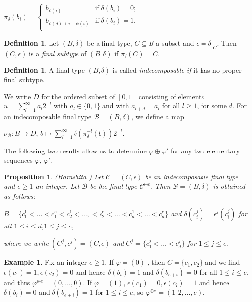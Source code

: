 \documentclass[11pt,table]{amsart}
\numberwithin{equation}{section}
\newtheorem{prop}[thm]{Proposition}
\theoremstyle{definition}
\newtheorem{defn}[thm]{Definition}
\newtheorem{eg}[thm]{Example}
\theoremstyle{remark}
\theoremstyle{remark}
\begin{document}
\begin{center}
    $\pi_{\delta} \left( b_{i} \right)  = \left\{
	\begin{array}{ll}
		 b_{\psi(i)}   & \mbox{if } \delta(b_{i}) = 0; \\
		b_{\psi(d) + i - \psi(i)} & \mbox{if } \delta(b_{i}) =1.  \\
	\end{array}
\right.$
\end{center}
\begin{defn}
   Let $(B, \delta)$ be a final type, $C \subseteq B$ a subset and $ \epsilon = \delta \vert _{C}$. Then $(C, \epsilon)$ is a \textit{final subtype} of $(B, \delta)$ if $ \pi_{\delta}(C) = C$. 
\end{defn}
\begin{defn}
 A final type $(B, \delta)$ is called \textit{indecomposable if} it has no proper final subtype.    
\end{defn}
We write $D$ for the ordered subset of $[0,1]$ consisting of elements $u =  \sum_{l=1}^{\infty} a_{l}2^{-l} $ with $a_{l} \in \{0, 1 \} $ and with $a_{l+d} = a_{l}$ for all $l \ge 1$, for some $d$.  For an indecomposable final type $\mathcal{B} = (B, \delta)$, we define a map 
\begin{center}
$\nu_{\mathcal{B}} : B \rightarrow D
$, $b \mapsto \displaystyle \sum_{l=1}^{\infty } \delta( \pi_{\delta}^{- l}(b)) 2^{-l}$. 
\end{center}
The following two results allow us to determine $\varphi \oplus \varphi'$ for any two elementary sequences $\varphi$, $\varphi'$.


\begin{prop}{({\rm Harashita} \cite[Corollary 4.8 (i)]{harashita2009configuration})}
Let $\mathcal{C} = (C, \epsilon)$ be an  indecomposable final type and $e \ge 1$ an integer. Let $\mathcal{B}$ be the final type $\mathcal{C}^{\oplus e}$. Then $ \mathcal{B} = (B , \delta)$ is obtained as follows: 
\begin{center}
    $B = \{ c_{1}^{1} < \ldots < c_{1}^{e} < c_{2}^{1} < \ldots, < c_{2}^{e} < \ldots < c_{d}^{1} < \ldots < c_{d}^{e} \}$ and $\delta(c_{i}^{j}) = \epsilon^{j}(c_{i}^{j})$ for all $1 \le i \le d$,$ 1 \le j \le e$, 
    \end{center}
where we write  $ (C^{j}, \epsilon^{j}) = (C, \epsilon)$ and $C^{j} = \{ c_{1}^{j} < \ldots < c_{d}^{j} \}$ for $ 1 \le j \le e$.
    \end{prop}
\begin{eg} Fix an integer $e \ge 1$. If $\varphi = (0)$ , then $C = \{ c_1, c_2 \}$ and we find $\epsilon(c_1) =1, \epsilon(c_2) =0$ and hence $\delta(b_i) =1 $ and $\delta( b_{e+ i}) =0$ for all $ 1 \le i \le e$, and thus $\varphi^{\oplus e } = (0, \ldots, 0)$. If $\varphi = (1)$,  $\epsilon(c_1) = 0 , \epsilon(c_2) =1$ and hence 
$\delta(b_i) =0 $ and $\delta( b_{e+ i}) =1$ for $ 1 \le i \le e$, so $ \varphi^{\oplus e} = (1,2,\ldots, e )$.
\end{eg}
    
\end{document}
